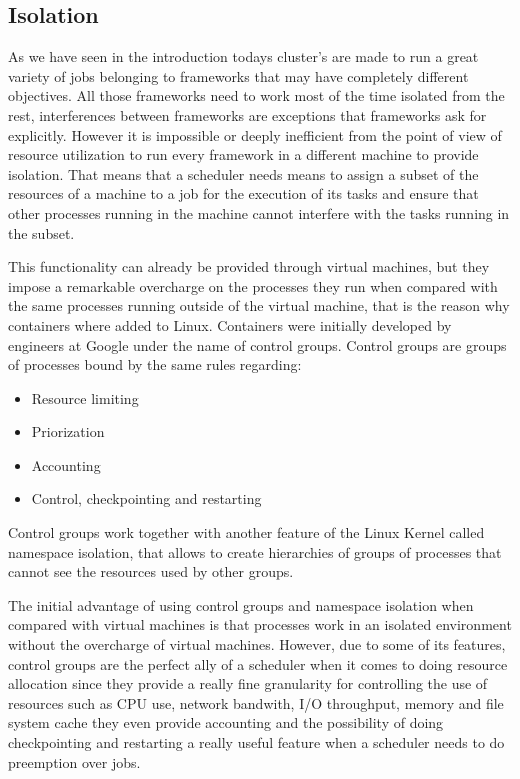 \documentclass{svjour3}                     %
\begin{document}

\subsection{Isolation}

As we have seen in the introduction todays cluster's are made to run a
great variety of jobs belonging to frameworks that may have completely
different objectives. All those frameworks need to work most of the
time isolated from the rest, interferences between frameworks are
exceptions that frameworks ask for explicitly. However it is
impossible or deeply inefficient from the point of view of resource
utilization to run every framework in a different machine to provide
isolation. That means that a scheduler needs means to assign a subset
of the resources of a machine to a job for the execution of its tasks
and ensure that other processes running in the machine cannot
interfere with the tasks running in the subset.

This functionality can already be provided through virtual machines,
but they impose a remarkable overcharge on the processes they run when
compared with the same processes running outside of the virtual
machine, that is the reason why containers where added to
Linux. Containers were initially developed by engineers at Google
under the name of control groups. Control groups are groups of
processes bound by the same rules regarding: \\

\begin{itemize}
  \item Resource limiting
  \item Priorization
  \item Accounting
  \item Control, checkpointing and restarting
\end{itemize}

Control groups work together with another feature of the Linux Kernel
called namespace isolation, that allows to create hierarchies of
groups of processes that cannot see the resources used by other
groups.

The initial advantage of using control groups and namespace isolation when
compared with virtual machines is that processes work in an isolated
environment without the overcharge of virtual machines. However, due
to some of its features, control groups are the perfect ally of a
scheduler when it comes to doing resource allocation since they provide
a really fine granularity for controlling the use of resources such
as CPU use, network bandwith, I/O throughput, memory and file system 
cache they even provide accounting and the possibility of doing
checkpointing and restarting a really useful feature when a scheduler
needs to do preemption over jobs.
\end{document}
